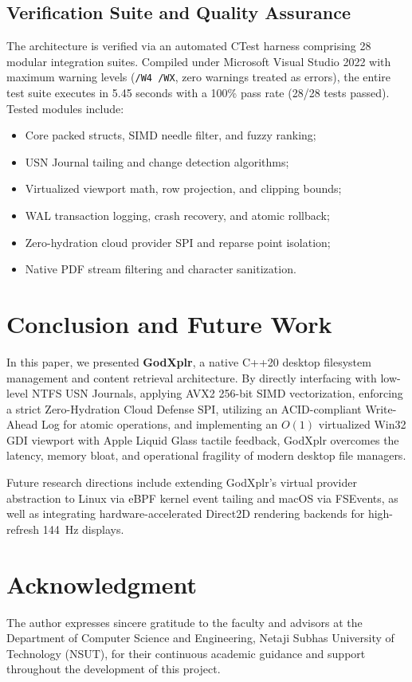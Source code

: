 \documentclass[conference]{IEEEtran}
\begin{document}
\subsection{Verification Suite and Quality Assurance}
The architecture is verified via an automated CTest harness comprising 28 modular integration suites. Compiled under Microsoft Visual Studio 2022 with maximum warning levels (\texttt{/W4 /WX}, zero warnings treated as errors), the entire test suite executes in 5.45 seconds with a 100\% pass rate (28/28 tests passed). Tested modules include:
\begin{itemize}
    \item Core packed structs, SIMD needle filter, and fuzzy ranking;
    \item USN Journal tailing and change detection algorithms;
    \item Virtualized viewport math, row projection, and clipping bounds;
    \item WAL transaction logging, crash recovery, and atomic rollback;
    \item Zero-hydration cloud provider SPI and reparse point isolation;
    \item Native PDF stream filtering and character sanitization.
\end{itemize}

\section{Conclusion and Future Work}

In this paper, we presented \textbf{GodXplr}, a native C++20 desktop filesystem management and content retrieval architecture. By directly interfacing with low-level NTFS USN Journals, applying AVX2 256-bit SIMD vectorization, enforcing a strict Zero-Hydration Cloud Defense SPI, utilizing an ACID-compliant Write-Ahead Log for atomic operations, and implementing an $O(1)$ virtualized Win32 GDI viewport with Apple Liquid Glass tactile feedback, GodXplr overcomes the latency, memory bloat, and operational fragility of modern desktop file managers.

Future research directions include extending GodXplr's virtual provider abstraction to Linux via eBPF kernel event tailing and macOS via FSEvents, as well as integrating hardware-accelerated Direct2D rendering backends for high-refresh 144~Hz displays.

\section*{Acknowledgment}
The author expresses sincere gratitude to the faculty and advisors at the Department of Computer Science and Engineering, Netaji Subhas University of Technology (NSUT), for their continuous academic guidance and support throughout the development of this project.
\end{document}
